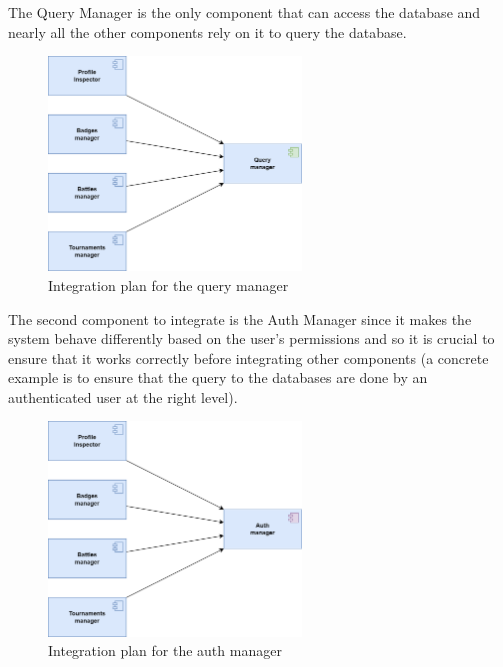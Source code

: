 The Query Manager is the only component that can access the database and nearly all the other components rely on it to query the database. \\
\begin{figure}[H]
    \centering
    \includegraphics[width=0.6\textwidth]{images/test_plan/test-plan-3.png}
    \caption{Integration plan for the query manager}
    \label{fig:test-plan-3}
\end{figure}

The second component to integrate is the Auth Manager since it makes the system behave differently based on the user's permissions and so it is crucial to ensure that it works correctly before integrating other components (a concrete example is to ensure that the query to the databases are done by an authenticated user at the right level).\\
\begin{figure}[H]
    \centering
    \includegraphics[width=0.6\textwidth]{images/test_plan/test-plan-2.png}
    \caption{Integration plan for the auth manager}
    \label{fig:test-plan-2}
\end{figure}

